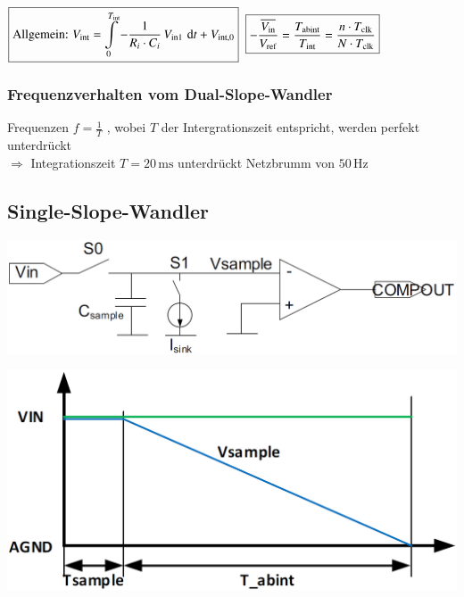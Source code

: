 $\boxed{\text{Allgemein: } V_{\rm int} = \int\limits_0^{T_{\rm int}} - \frac{1}{R_i \cdot C_i} \, V_{\rm in1} \, \mathop{} \! \mathrm{d} t + V_{\rm int,0} }$
\quad 
$ \boxed{ -\frac{\overline{V_{\rm in}}}{V_{\rm ref}}= \frac{T_{\rm abint}}{T_{\rm int}} = \frac{n \cdot T_{\rm clk}}{N \cdot T_{\rm  clk} } }$


\subsubsection{Frequenzverhalten vom Dual-Slope-Wandler}

Frequenzen $f = \frac{1}{T}$ , wobei $T$ der Intergrationszeit entspricht, werden perfekt unterdrückt \\
$\Rightarrow$ Integrationszeit $T = 20 \, \mathrm{ms}$ unterdrückt Netzbrumm von $50 \, \mathrm{Hz}$


\subsection{Single-Slope-Wandler}

\begin{minipage}[c]{0.52\columnwidth}
    \includegraphics[width=\columnwidth]{images/single-slope-wandler.png}
\end{minipage}
\hfill
\begin{minipage}[c]{0.38\columnwidth}
    \includegraphics[width=\columnwidth]{images/single-slope-wandler_timing.png}
\end{minipage}

